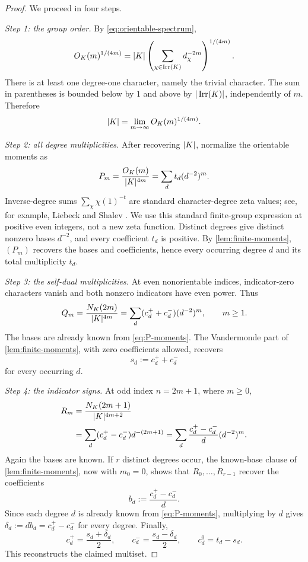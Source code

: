 \begin{proof}
We proceed in four steps.

\emph{Step 1: the group order.}
By \eqref{eq:orientable-spectrum},
\[
 O_{K}(m)^{1/(4m)}
 =|K|\left(\sum_{\chi\in\operatorname{Irr}(K)}d_\chi^{-2m}\right)^{1/(4m)}.
\]
There is at least one degree-one character, namely the trivial character.  The
sum in parentheses is bounded below by $1$ and above by
$|\operatorname{Irr}(K)|$, independently of $m$.  Therefore
\begin{equation}
 |K|=\lim_{m\to\infty}O_{K}(m)^{1/(4m)}.
 \label{eq:recover-order}
\end{equation}

\emph{Step 2: all degree multiplicities.}
After recovering $|K|$, normalize the orientable moments as
\begin{equation}
 P_m=\frac{O_{K}(m)}{|K|^{4m}}
     =\sum_d t_d(d^{-2})^m.
 \label{eq:P-moments}
\end{equation}
Inverse-degree sums $\sum_{\chi}\chi(1)^{-t}$ are standard character-degree
zeta values; see, for example, Liebeck and Shalev \cite{LiebeckShalev2005}.
We use this standard finite-group expression at positive even integers, not a new zeta
function.  Distinct degrees give distinct nonzero bases $d^{-2}$, and every
coefficient $t_d$ is positive.  By \cref{lem:finite-moments}, $(P_m)$ recovers
the bases and coefficients, hence every occurring degree $d$ and its total
multiplicity $t_d$.

\emph{Step 3: the self-dual multiplicities.}
At even nonorientable indices, indicator-zero characters vanish and both
nonzero indicators have even power.  Thus
\begin{equation}
 Q_m=\frac{N_{K}(2m)}{|K|^{4m}}
 =\sum_d(c_d^++c_d^-)(d^{-2})^m,
 \qquad m\geq1.
 \label{eq:Q-moments}
\end{equation}
The bases are already known from \eqref{eq:P-moments}.  The Vandermonde part
of \cref{lem:finite-moments}, with zero coefficients allowed, recovers
\[
 s_d:=c_d^++c_d^-
\]
for every occurring $d$.

\emph{Step 4: the indicator signs.}
At odd index $n=2m+1$, where $m\geq0$,
\begin{align}
 R_m&=\frac{N_{K}(2m+1)}{|K|^{4m+2}}\notag\\
 &=\sum_d(c_d^+-c_d^-)d^{-(2m+1)}
  =\sum_d\frac{c_d^+-c_d^-}{d}(d^{-2})^m.
 \label{eq:R-moments}
\end{align}
Again the bases are known.  If $r$ distinct degrees occur, the known-base
clause of \cref{lem:finite-moments}, now with $m_0=0$, shows that
$R_0,\ldots,R_{r-1}$ recover the coefficients
\[
 b_d:=\frac{c_d^+-c_d^-}{d}.
\]
Since each degree $d$ is already known from \eqref{eq:P-moments}, multiplying
by $d$ gives $\delta_d:=d b_d=c_d^+-c_d^-$ for every degree.  Finally,
\begin{equation}
 c_d^+=\frac{s_d+\delta_d}{2},\qquad
 c_d^-=\frac{s_d-\delta_d}{2},\qquad
 c_d^0=t_d-s_d.
 \label{eq:multiplicity-recovery}
\end{equation}
This reconstructs the claimed multiset.
\end{proof}

